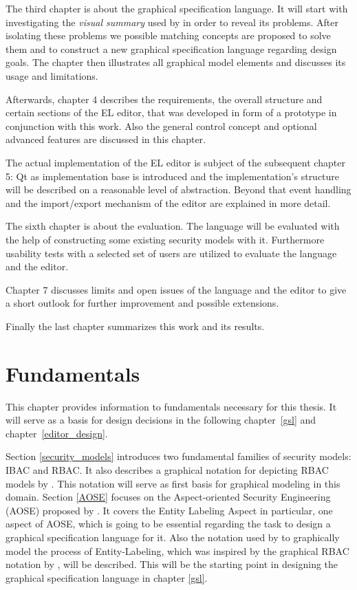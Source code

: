 \documentclass[twoside, openright, 12pt]{book}
\begin{document}
The third chapter is about the graphical specification language.
It will start with investigating the \textit{visual summary} used by \cite{Amthor18} in order to reveal its problems.
After isolating these problems we possible matching concepts are proposed to solve them and to construct a new graphical specification language regarding design goals.
The chapter then illustrates all graphical model elements and discusses its usage and limitations.

Afterwards, chapter 4 describes the requirements, the overall structure and certain sections of the EL editor, that was developed in form of a prototype in conjunction with this work.
Also the general control concept and optional advanced features are discussed in this chapter.

The actual implementation of the EL editor is subject of the subsequent chapter 5:
Qt as implementation base is introduced and the implementation's structure will be described on a reasonable level of abstraction.
Beyond that event handling and the import/export mechanism of the editor are explained in more detail.

The sixth chapter is about the evaluation.
The language will be evaluated with the help of constructing some existing security models with it.
Furthermore usability tests with a selected set of users are utilized to evaluate the language and the editor.

Chapter 7 discusses limits and open issues of the language and the editor to give a short outlook for further improvement and possible extensions.

Finally the last chapter summarizes this work and its results.



\cleardoublepage
\chapter{Fundamentals}
\label{fundamentals}
This chapter provides information to fundamentals necessary for this thesis.
It will serve as a basis for design decisions in the following chapter~\ref{gsl} and chapter~\ref{editor_design}.

Section \ref{security_models} introduces two fundamental families of security models: IBAC and RBAC.
It also describes a graphical notation for depicting RBAC models by \cite{Sandhu96}.
This notation will serve as first basis for graphical modeling in this domain.
Section \ref{AOSE} focuses on the Aspect-oriented Security Engineering (AOSE) proposed by \citet*{Amthor18}.
It covers the Entity Labeling Aspect in particular, one aspect of AOSE, which is going to be essential regarding the task to design a graphical specification language for it.
Also the notation used by \citet*{Amthor18} to graphically model the process of Entity-Labeling, which was inspired by the graphical RBAC notation by \cite{Sandhu96}, will be described.
This will be the starting point in designing the graphical specification language in chapter \ref{gsl}.
\end{document}
